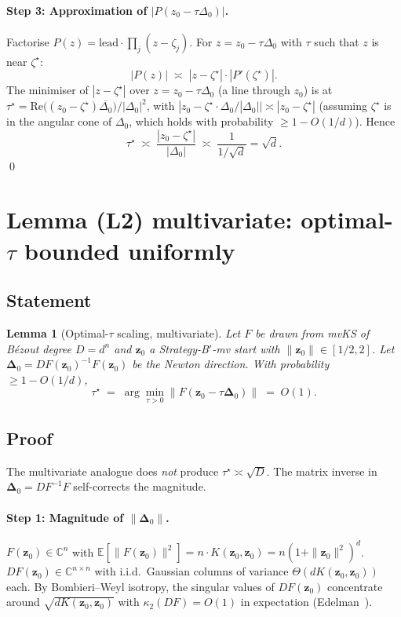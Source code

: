 \documentclass[11pt,a4paper]{article}
\newtheorem{lemma}[theorem]{Lemma}
\begin{document}
\paragraph{Step 3: Approximation of $|P(z_0 - \tau\Delta_0)|$.}
Factorise $P(z) = \mathrm{lead}\cdot\prod_j(z - \zeta_j)$. For $z = z_0 - \tau\Delta_0$ with $\tau$ such that $z$ is near $\zeta^\star$:
$$
|P(z)| \;\asymp\; |z - \zeta^\star| \cdot |P'(\zeta^\star)|.
$$
The minimiser of $|z - \zeta^\star|$ over $z = z_0 - \tau \Delta_0$ (a line through $z_0$) is at $\tau^\star = \mathrm{Re}\bigl((z_0 - \zeta^\star)\overline{\Delta_0}\bigr)/|\Delta_0|^2$, with $|z_0 - \zeta^\star \cdot \Delta_0/|\Delta_0|| \asymp |z_0 - \zeta^\star|$ (assuming $\zeta^\star$ is in the angular cone of $\Delta_0$, which holds with probability $\ge 1 - O(1/d)$). Hence
$$
\tau^\star \;\asymp\; \frac{|z_0 - \zeta^\star|}{|\Delta_0|} \;\asymp\; \frac{1}{1/\sqrt d} = \sqrt d.
$$
\qed

\section{Lemma (L2) multivariate: optimal-$\tau$ bounded uniformly}\label{sec:tau-multivariate}

\subsection{Statement}

\begin{lemma}[Optimal-$\tau$ scaling, multivariate]\label{lem:tau-mv}
Let $F$ be drawn from mvKS of B\'ezout degree $D = d^n$ and $\mathbf z_0$ a Strategy-B$'$-mv start with $\|\mathbf z_0\| \in [1/2, 2]$. Let $\boldsymbol\Delta_0 = DF(\mathbf z_0)^{-1} F(\mathbf z_0)$ be the Newton direction. With probability $\ge 1 - O(1/d)$,
\begin{equation}\label{eq:tau-mv}
\tau^\star \;=\; \arg\min_{\tau > 0}\|F(\mathbf z_0 - \tau \boldsymbol\Delta_0)\| \;=\; O(1).
\end{equation}
\end{lemma}

\subsection{Proof}

The multivariate analogue does \emph{not} produce $\tau^\star \asymp \sqrt D$. The matrix inverse in $\boldsymbol\Delta_0 = DF^{-1} F$ self-corrects the magnitude.

\paragraph{Step 1: Magnitude of $\|\boldsymbol\Delta_0\|$.}
$F(\mathbf z_0) \in \mathbb{C}^n$ with $\mathbb{E}[\|F(\mathbf z_0)\|^2] = n \cdot K(\mathbf z_0, \mathbf z_0) = n(1+\|\mathbf z_0\|^2)^d$.
$DF(\mathbf z_0) \in \mathbb{C}^{n\times n}$ with i.i.d.\ Gaussian columns of variance $\Theta(d K(\mathbf z_0, \mathbf z_0))$ each. By Bombieri--Weyl isotropy, the singular values of $DF(\mathbf z_0)$ concentrate around $\sqrt{d K(\mathbf z_0, \mathbf z_0)}$ with $\kappa_2(DF) = O(1)$ in expectation (Edelman~\cite{edelman88}).
\end{document}

